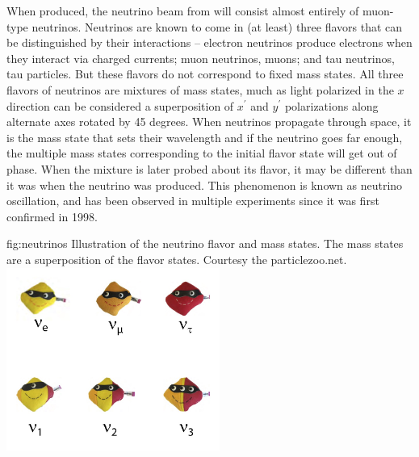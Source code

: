 \documentclass[../main-v1.tex]{subfiles}
\begin{document}

When produced, the neutrino beam from  will consist almost entirely of muon-type neutrinos. %
Neutrinos are known to come in (at least) three flavors that can be distinguished by their interactions -- electron %
neutrinos produce electrons when they interact via charged currents; muon neutrinos, muons; and tau neutrinos, tau particles.  But these flavors do not correspond to fixed mass states.  All three flavors of neutrinos are mixtures of mass states, much as  light polarized in the $x$ direction  can be considered a superposition of  $x^\prime$ and $y^\prime$ polarizations along  alternate axes rotated by 45 degrees.  When neutrinos propagate through space, it is the mass state that sets their wavelength and if the neutrino goes far enough, the multiple mass states  corresponding to the initial flavor state will get out of phase.  When the mixture is later probed about its flavor, it may be different than it was when the neutrino was produced. %
This phenomenon is known as neutrino oscillation, and has been %
observed in multiple experiments since it was first confirmed in 1998\cite{Kajita2006}.


\begin{dunefigure}
{fig:neutrinos}
{Illustration of the neutrino flavor and mass states.  The mass states are a superposition of the flavor states.  Courtesy the particlezoo.net.}
\includegraphics[height=6cm]{graphics/IntroFigures/Fig_01_neutrinos.jpg}
\end{dunefigure}
\end{document}
